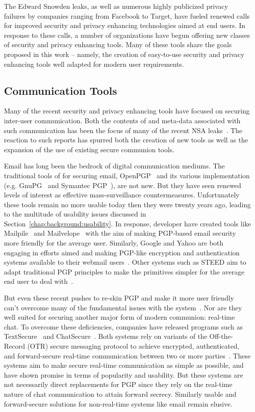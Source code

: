 The Edward Snowden leaks, as well as numerous highly publicized
privacy failures by companies ranging from Facebook to Target, have
fueled renewed calls for improved security and privacy enhancing
technologies aimed at end users. In response to these calls, a number
of organizations have begun offering new classes of security and
privacy enhancing tools. Many of these tools share the goals proposed
in this work -- namely, the creation of easy-to-use security and
privacy enhancing tools well adapted for modern user requirements.

\subsection{Communication Tools}

Many of the recent security and privacy enhancing tools have focused
on securing inter-user communication. Both the contents of and
meta-data associated with such communication has been the focus of
many of the recent NSA leaks~\cite{schneier-metadata}. The reaction to
such reports has spurred both the creation of new tools as well as the
expansion of the use of existing secure communion tools.

Email has long been the bedrock of digital communication mediums. The
traditional tools of for securing email, OpenPGP~\cite{openpgp} and
its various implementation (e.g. GnuPG~\cite{gnupg} and Symantec
PGP~\cite{pgp}), are not new. But they have seen renewed levels of
interest as effective mass-surveillance countermeasures. Unfortunately
these tools remain no more usable today then they were twenty years
ago, leading to the multitude of usability issues discussed in
Section~\ref{chap:background:usability}. In response, developer have
created tools like Mailpile~\cite{mailpile} and
Mailvelope~\cite{mailvelope} with the aim of making PGP-based email
security more friendly for the average user. Similarly, Google and
Yahoo are both engaging in efforts aimed and making PGP-like
encryption and authentication systems available to their webmail
users~\cite{google-endtoend, yahoo-endtoend}. Other systems such as
STEED aim to adapt traditional PGP principles to make the primitives
simpler for the average end user to deal with~\cite{koch2011}.

But even these recent pushes to re-skin PGP and make it more user
friendly can't overcome many of the fundamental issues with the
system~\cite{green-pgp}. Nor are they well suited for securing another
major form of modern communion: real-time chat. To overcome these
deficiencies, companies have released programs such as
TextSecure~\cite{openwhisper} and ChatSecure~\cite{chatsecure}. Both
systems rely on variants of the Off-the-Record (OTR) secure messaging
protocol to achieve encrypted, authenticated, and forward-secure
real-time communication between two or more parties~\cite{otr-v3,
  borisov2004, goldberg2009}. These systems aim to make secure
real-time communication as simple as possible, and have shown promise
in terms of popularity and usability. But these systems are not
necessarily direct replacements for PGP since they rely on the
real-time nature of chat communication to attain forward
secrecy. Similarly usable and forward-secure solutions for
non-real-time systems like email remain elusive.

